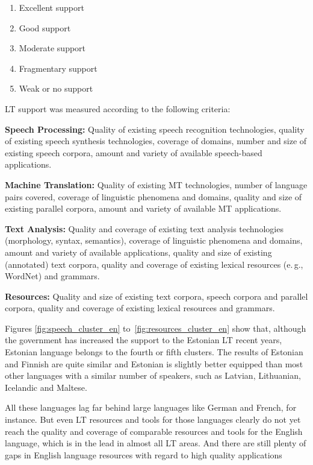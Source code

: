 \documentclass[]{../metanetpaper}
\begin{document}
\begin{multicols}{2}
\begin{enumerate}
\item Excellent support
\item Good support
\item Moderate support
\item Fragmentary support
\item Weak or no support
\end{enumerate}

LT support was measured according to the following criteria:

\textbf{Speech Processing:} Quality of existing speech recognition technologies, quality of existing speech synthesis technologies, coverage of domains, number and size of existing speech corpora, amount and variety of available speech-based applications.

\textbf{Machine Translation:} Quality of existing MT technologies, number of language pairs covered, coverage of linguistic phenomena and domains, quality and size of existing parallel corpora, amount and variety of available MT applications.

\textbf{Text Analysis:} Quality and coverage of existing text analysis technologies (morphology, syntax, semantics), coverage of linguistic phenomena and domains, amount and variety of available applications, quality and size of existing (annotated) text corpora, quality and coverage of existing lexical resources (e.\,g., WordNet) and grammars.

\textbf{Resources:} Quality and size of existing text corpora, speech corpora and parallel corpora, quality and coverage of existing lexical resources and grammars.

Figures \ref{fig:speech_cluster_en} to~\ref{fig:resources_cluster_en} show that, although the government has increased the support to the Estonian LT recent years, Estonian language belongs to the fourth or fifth clusters. 
The results of Estonian and Finnish are quite similar and Estonian is slightly better equipped than most other languages with a similar number of speakers, such as Latvian, Lithuanian, Icelandic and Maltese. 

All these languages lag far behind large languages like German and French, for instance. 
But even LT resources and tools for those languages clearly do not yet reach the quality and coverage of comparable resources and tools for the English language, which is in the lead in almost all LT areas. 
And there are still plenty of gaps in English language resources with regard to high quality applications


\end{multicols}
\end{document}
